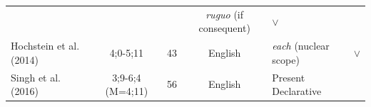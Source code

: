 \documentclass[oneside]{report}
\theoremstyle{definition}
\theoremstyle{definition}
\theoremstyle{definition}
\theoremstyle{remark}
\begin{document}
\begin{longtable}[]{@{}lccclc@{}}
\begin{minipage}[t]{0.07\columnwidth}
\strut
\end{minipage} & \begin{minipage}[t]{0.05\columnwidth}\centering\strut
\strut
\end{minipage} & \begin{minipage}[t]{0.10\columnwidth}\centering\strut
\strut
\end{minipage} & \begin{minipage}[t]{0.25\columnwidth}\raggedright\strut
\emph{ruguo} (if consequent)\strut
\end{minipage} & \begin{minipage}[t]{0.13\columnwidth}\centering\strut
\(\lor\)\strut
\end{minipage}\tabularnewline
\begin{minipage}[t]{0.23\columnwidth}\raggedright\strut
Hochstein et al. (2014)\strut
\end{minipage} & \begin{minipage}[t]{0.07\columnwidth}\centering\strut
4;0-5;11\strut
\end{minipage} & \begin{minipage}[t]{0.05\columnwidth}\centering\strut
43\strut
\end{minipage} & \begin{minipage}[t]{0.10\columnwidth}\centering\strut
English\strut
\end{minipage} & \begin{minipage}[t]{0.25\columnwidth}\raggedright\strut
\emph{each} (nuclear scope)\strut
\end{minipage} & \begin{minipage}[t]{0.13\columnwidth}\centering\strut
\(\lor\)\strut
\end{minipage}\tabularnewline
\begin{minipage}[t]{0.23\columnwidth}\raggedright\strut
Singh et al. (2016)\strut
\end{minipage} & \begin{minipage}[t]{0.07\columnwidth}\centering\strut
3;9-6;4 (M=4;11)\strut
\end{minipage} & \begin{minipage}[t]{0.05\columnwidth}\centering\strut
56\strut
\end{minipage} & \begin{minipage}[t]{0.10\columnwidth}\centering\strut
English\strut
\end{minipage} & \begin{minipage}[t]{0.25\columnwidth}\raggedright\strut
Present Declarative\strut
\end{minipage} & \begin{minipage}[t]{0.13\columnwidth}\centering\strut

\end{minipage}
\end{longtable}
\end{document}
